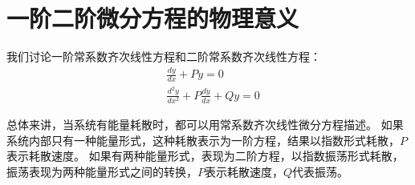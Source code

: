 \section{一阶二阶微分方程的物理意义}

我们讨论一阶常系数齐次线性方程和二阶常系数齐次线性方程：
\begin{align*}
&\frac{dy}{dx}+Py=0 \\
&\frac{d^2y}{dx^2}+P\frac{dy}{dx}+Qy=0
\end{align*}

总体来讲，当系统有能量耗散时，都可以用常系数齐次线性微分方程描述。
如果系统内部只有一种能量形式，这种耗散表示为一阶方程，结果以指数形式耗散，$P$表示耗散速度。
如果有两种能量形式，表现为二阶方程，以指数振荡形式耗散，振荡表现为两种能量形式之间的转换，$P$表示耗散速度，$Q$代表振荡。




